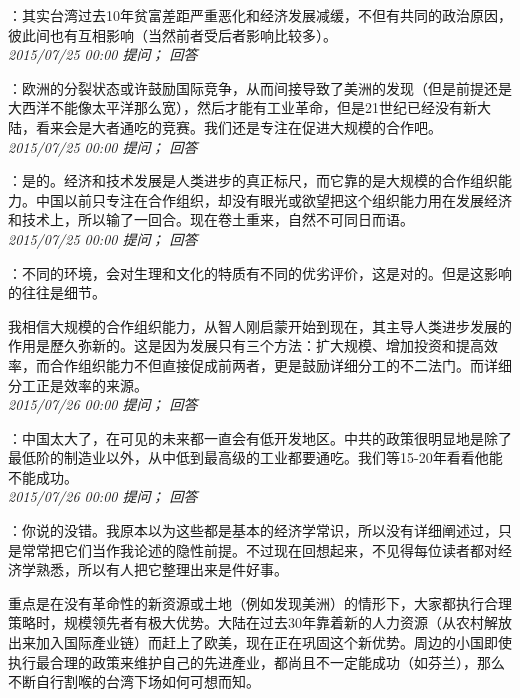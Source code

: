 \documentclass[twocolumn]{ctexart}
\begin{document}
：其实台湾过去10年贫富差距严重恶化和经济发展减缓，不但有共同的政治原因，彼此间也有互相影响（当然前者受后者影响比较多）。\\

\textit{\hfill\noindent\small 2015/07/25 00:00 提问； 回答}

：欧洲的分裂状态或许鼓励国际竞争，从而间接导致了美洲的发现（但是前提还是大西洋不能像太平洋那么宽），然后才能有工业革命，但是21世纪已经没有新大陆，看来会是大者通吃的竞赛。我们还是专注在促进大规模的合作吧。\\

\textit{\hfill\noindent\small 2015/07/25 00:00 提问； 回答}

：是的。经济和技术发展是人类进步的真正标尺，而它靠的是大规模的合作组织能力。中国以前只专注在合作组织，却没有眼光或欲望把这个组织能力用在发展经济和技术上，所以输了一回合。现在卷土重来，自然不可同日而语。\\

\textit{\hfill\noindent\small 2015/07/25 00:00 提问； 回答}

：不同的环境，会对生理和文化的特质有不同的优劣评价，这是对的。但是这影响的往往是细节。

我相信大规模的合作组织能力，从智人刚启蒙开始到现在，其主导人类进步发展的作用是歷久弥新的。这是因为发展只有三个方法：扩大规模、增加投资和提高效率，而合作组织能力不但直接促成前两者，更是鼓励详细分工的不二法门。而详细分工正是效率的来源。\\

\textit{\hfill\noindent\small 2015/07/26 00:00 提问； 回答}

：中国太大了，在可见的未来都一直会有低开发地区。中共的政策很明显地是除了最低阶的制造业以外，从中低到最高级的工业都要通吃。我们等15-20年看看他能不能成功。\\

\textit{\hfill\noindent\small 2015/07/26 00:00 提问； 回答}

：你说的没错。我原本以为这些都是基本的经济学常识，所以没有详细阐述过，只是常常把它们当作我论述的隐性前提。不过现在回想起来，不见得每位读者都对经济学熟悉，所以有人把它整理出来是件好事。

重点是在没有革命性的新资源或土地（例如发现美洲）的情形下，大家都执行合理策略时，规模领先者有极大优势。大陆在过去30年靠着新的人力资源（从农村解放出来加入国际產业链）而赶上了欧美，现在正在巩固这个新优势。周边的小国即使执行最合理的政策来维护自己的先进產业，都尚且不一定能成功（如芬兰），那么不断自行割喉的台湾下场如何可想而知。\\
\end{document}

